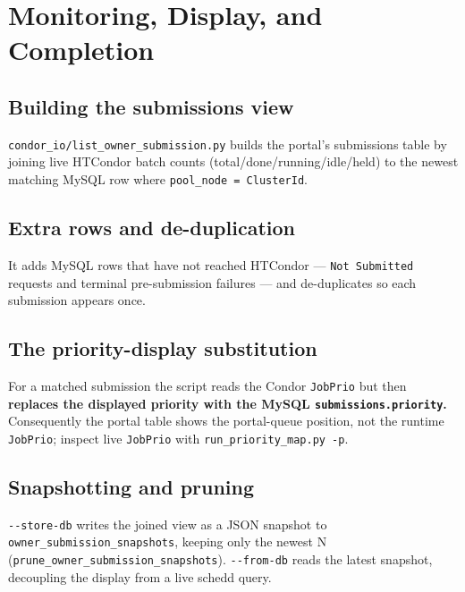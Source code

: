 \section{Monitoring, Display, and Completion}\label{ch:13}

\subsection{Building the submissions view}

\texttt{condor\_\allowbreak{}io/\allowbreak{}list\_\allowbreak{}owner\_\allowbreak{}submission.\allowbreak{}py}
builds the portal's submissions table by joining live HTCondor batch counts (total/done/running/idle/held) to
the newest matching MySQL row where \texttt{pool\_\allowbreak{}node =\allowbreak{} ClusterId}.

\subsection{Extra rows and de-duplication}

It adds MySQL rows that have not reached HTCondor --- \texttt{Not Submitted} requests and terminal
pre-submission failures --- and de-duplicates so each submission appears once.

\subsection{The priority-display substitution}

For a matched submission the script reads the Condor \texttt{JobPrio} but then \textbf{replaces the displayed
priority with the MySQL \texttt{submissions.\allowbreak{}priority}.} Consequently the portal table shows the
portal-queue position, not the runtime \texttt{JobPrio}; inspect live \texttt{JobPrio} with
\texttt{run\_\allowbreak{}priority\_\allowbreak{}map.\allowbreak{}py -\allowbreak{}p}.

\subsection{Snapshotting and pruning}

\texttt{-\allowbreak{}-\allowbreak{}store-\allowbreak{}db} writes the joined view as a JSON snapshot to
\texttt{owner\_\allowbreak{}submission\_\allowbreak{}snapshots}, keeping only the newest N
(\texttt{prune\_\allowbreak{}owner\_\allowbreak{}submission\_\allowbreak{}snapshots}).
\texttt{-\allowbreak{}-\allowbreak{}from-\allowbreak{}db} reads the latest snapshot, decoupling the display
from a live schedd query.

